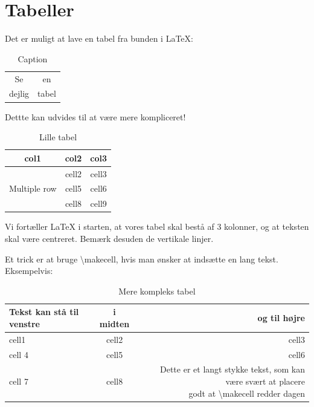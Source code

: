\section{Tabeller}

Det er muligt at lave en tabel fra bunden i LaTeX:
\begin{table}[H]
    \centering
    \begin{tabular}{c|c}
        Se & en \\
        dejlig & tabel
    \end{tabular}
    \caption{Caption}
    \label{tab:my_label}
\end{table}

Dettte kan udvides til at være mere kompliceret!
\begin{table}[H]
    \centering
    \begin{tabular}{|c|c|c|} 
        \hline
        col1 & col2 & col3 \\
        \hline
        \multirow{3}{4em}{Multiple row} & cell2 & cell3 \\ 
        & cell5 & cell6 \\ 
        & cell8 & cell9 \\ 
        \hline
    \end{tabular}
    \caption{Lille tabel}
    \label{tab:lille_tabel}
\end{table}

Vi fortæller LaTeX i starten, at vores tabel skal bestå af 3 kolonner, og at teksten skal være centreret. Bemærk desuden de vertikale linjer.

Et trick er at bruge \textbackslash makecell, hvis man ønsker at indsætte en lang tekst. Eksempelvis:
\begin{table}[H]
    \centering
    \begin{tabular}{l|c|r} 
        \hline
        Tekst kan stå til venstre & i midten & og til højre \\
        \hline\hline
        cell1 & cell2 & cell3 \\ 
        cell 4 & cell5 & cell6 \\ 
        cell 7 & cell8 & \makecell[r]{Dette er et langt stykke tekst, som kan være svært at placere \\ godt at \textbackslash makecell redder dagen} \\ 
        \hline
    \end{tabular}
    \caption{Mere kompleks tabel}
    \label{tab:kompleks_tabel}
\end{table}

